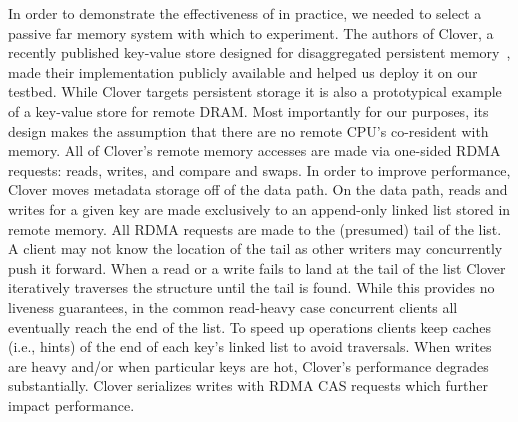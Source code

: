 In order to demonstrate the effectiveness of {\sword} in practice, we
needed to select a passive far memory system with which to experiment.
The authors of Clover, a recently published key-value store designed
for disaggregated persistent memory~\cite{clover}, made their
implementation publicly available and helped us deploy it on our
testbed. While Clover targets persistent storage it is also a
prototypical example of a key-value store for remote DRAM.  Most
importantly for our purposes, its design makes the assumption that
there are no remote CPU's co-resident with memory. All of Clover's
remote memory accesses are made via one-sided RDMA requests: reads,
writes, and compare and swaps.  In order to improve performance,
Clover moves metadata storage off of the data path. On the data path,
reads and writes for a given key are made exclusively to an
append-only linked list stored in remote memory. All RDMA requests are
made to the (presumed) tail of the list. A client may not know the
location of the tail as other writers may concurrently push it
forward.  When a read or a write fails to land at the tail of the list
Clover iteratively traverses the structure until the tail is
found. While this provides no liveness guarantees, in the common
read-heavy case concurrent clients all eventually reach the end of the
list. To speed up operations clients keep caches (i.e., hints) of the
end of each key's linked list to avoid traversals. When writes are
heavy and/or when particular keys are hot, Clover's performance
degrades substantially. Clover serializes writes with RDMA CAS
requests which further impact performance.


